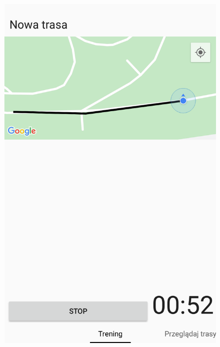 \begin{figure}[H]
\centering
\begin{minipage}{.5\textwidth}
  \centering
  \captionsetup{justification=centering}
  \includegraphics[width=.8\linewidth,frame]{img/tworzenie}
  \label{image:tworzenie-screen}
\end{minipage}%
\begin{minipage}{.5\textwidth}
  \centering
  \captionsetup{justification=centering}

\end{minipage}
\end{figure}
